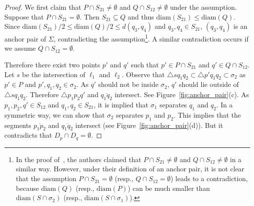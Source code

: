 \documentclass[english,a4paper, cleveref, autoref, thm-restate, nolineno]{socg-lipics-v2021}
\theoremstyle{star}
\theoremstyle{claimstar}
\newcommand{\diam}{\ensuremath{\mathrm{diam}}}
\begin{document}
\begin{proof}

    We first claim that $P \cap S_{21} \neq \emptyset$ and $Q \cap S_{12} \neq \emptyset$ under the assumption.
    Suppose that $P \cap S_{21} = \emptyset$. Then $S_{21} \subseteq Q$ and thus $\diam(S_{21}) \le \diam(Q)$.  
    Since $\diam(S_{21})/2 \le \diam(Q)/2 \le d(q_3, q_4)$ and $q_3, q_4 \in S_{21}$, $(q_3, q_4)$ is an anchor pair of $\Sigma$, contradicting the assumption\footnote{
    In the proof of~\cite{agarwalTwo}, the authors claimed that  $P \cap S_{21} \neq \emptyset$ and $Q \cap S_{12} \neq \emptyset$ in a similar way. 
    However, under their definition of an anchor pair, it is not clear that the assumption $P \cap S_{21} = \emptyset$ (resp., $Q \cap S_{12} = \emptyset$) leads to a contradiction,
    because $\diam(Q)$ (resp., $\diam(P)$) can be much smaller than $\diam(S \cap \sigma_2)$ (resp., $\diam(S \cap \sigma_1)$).}.
    A similar contradiction occurs if we assume $Q \cap S_{12} = \emptyset$.

    Therefore there exist two points $p'$ and $q'$ such that $p' \in P \cap S_{21}$ and $q' \in Q \cap S_{12}$.
    Let $s$ be the intersection of $\ell_1$ and $\ell_2$. 
    Observe that $\triangle sq_1 q_2 \subset \triangle p'q_1 q_2 \subset \sigma_2$ as $p' \in P$ and $p', q_1, q_2 \in \sigma_2$. 
    As $q'$ should not be inside $\sigma_2$, $q'$ should lie outside of $\triangle s q_1 q_2$. 
    Therefore $\triangle p_1 p_2 q'$ and $\overline{q_1 q_2}$ intersect. See Figure~\ref{fig:anchor_pair}(c).
    As $p_1, p_2, q' \in S_{12}$ and $q_1, q_2 \in S_{21}$, it is implied that  $\sigma_1$ separates $q_1$ and $q_2$.
    In a symmetric way, we can show that $\sigma_2$ separates $p_1$ and $p_2$. 
    This implies that the segments $\overline{p_1 p_2}$ and $\overline{q_1 q_2}$ intersect (see Figure~\ref{fig:anchor_pair}(d)). But it contradicts that $D_p \cap D_q = \emptyset$. 
\end{proof}
\end{document}
